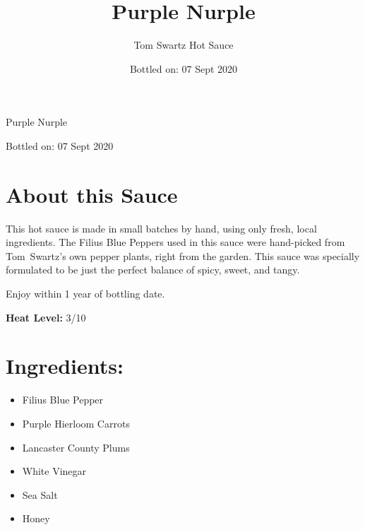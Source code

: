 \documentclass[12pt]{article}
\title{Purple Nurple}
\author{Tom Swartz Hot Sauce}
\date{Bottled on: 07 Sept 2020}
\begin{document}
\begin{center}
{\Huge Purple Nurple}
\par
{\Large Bottled on: 07 Sept 2020}
\vfill
\begin{minipage}{0.45\textwidth}
\Large
\section*{About this Sauce \color{black}\hrulefill\color{black}}
This hot sauce is made in small batches by hand, using only fresh,
local ingredients. The Filius Blue Peppers used in this sauce were
hand-picked from Tom~Swartz's own pepper plants, right from the garden.
This sauce was specially formulated to be just the perfect balance of
spicy, sweet, and tangy.
\par
Enjoy within 1 year of bottling date.

\begin{center}
        {\LARGE
        \textbf{Heat Level:} 3/10
        }
\end{center}
\end{minipage}
\hfill
\begin{minipage}{0.45\textwidth}
\vspace{-0.4cm}
\Large
\section*{\hspace{0.5cm}Ingredients: \color{black}\hrulefill\color{black}}
\begin{itemize}
        \item Filius Blue Pepper
        \item Purple Hierloom Carrots
        \item Lancaster County Plums
        \item White Vinegar
        \item Sea Salt
        \item Honey
\end{itemize}
\end{minipage}
\end{center}
\end{document}
